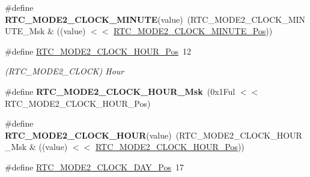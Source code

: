 \begin{DoxyCompactItemize}
\item 
\hypertarget{group___s_a_m_l21___r_t_c_ga852f4332930aecd5b658260e76f7bbf9}{}\#define {\bfseries R\+T\+C\+\_\+\+M\+O\+D\+E2\+\_\+\+C\+L\+O\+C\+K\+\_\+\+M\+I\+N\+U\+T\+E}(value)~(R\+T\+C\+\_\+\+M\+O\+D\+E2\+\_\+\+C\+L\+O\+C\+K\+\_\+\+M\+I\+N\+U\+T\+E\+\_\+\+Msk \& ((value) $<$$<$ \hyperlink{group___s_a_m_l21___r_t_c_ga6833c1b1a7d09a2acde357c93ffaa723}{R\+T\+C\+\_\+\+M\+O\+D\+E2\+\_\+\+C\+L\+O\+C\+K\+\_\+\+M\+I\+N\+U\+T\+E\+\_\+\+Pos}))\label{group___s_a_m_l21___r_t_c_ga852f4332930aecd5b658260e76f7bbf9}

\item 
\hypertarget{group___s_a_m_l21___r_t_c_ga9d3b894886a7457a79dea73e59447dfb}{}\#define \hyperlink{group___s_a_m_l21___r_t_c_ga9d3b894886a7457a79dea73e59447dfb}{R\+T\+C\+\_\+\+M\+O\+D\+E2\+\_\+\+C\+L\+O\+C\+K\+\_\+\+H\+O\+U\+R\+\_\+\+Pos}~12\label{group___s_a_m_l21___r_t_c_ga9d3b894886a7457a79dea73e59447dfb}

\begin{DoxyCompactList}\small\item\em (R\+T\+C\+\_\+\+M\+O\+D\+E2\+\_\+\+C\+L\+O\+C\+K) Hour \end{DoxyCompactList}\item 
\hypertarget{group___s_a_m_l21___r_t_c_ga805c8903fb32bb70279c4ba72478a2da}{}\#define {\bfseries R\+T\+C\+\_\+\+M\+O\+D\+E2\+\_\+\+C\+L\+O\+C\+K\+\_\+\+H\+O\+U\+R\+\_\+\+Msk}~(0x1\+Ful $<$$<$ R\+T\+C\+\_\+\+M\+O\+D\+E2\+\_\+\+C\+L\+O\+C\+K\+\_\+\+H\+O\+U\+R\+\_\+\+Pos)\label{group___s_a_m_l21___r_t_c_ga805c8903fb32bb70279c4ba72478a2da}

\item 
\hypertarget{group___s_a_m_l21___r_t_c_ga5778ea1a6ebd061005fb49ac68ab3d23}{}\#define {\bfseries R\+T\+C\+\_\+\+M\+O\+D\+E2\+\_\+\+C\+L\+O\+C\+K\+\_\+\+H\+O\+U\+R}(value)~(R\+T\+C\+\_\+\+M\+O\+D\+E2\+\_\+\+C\+L\+O\+C\+K\+\_\+\+H\+O\+U\+R\+\_\+\+Msk \& ((value) $<$$<$ \hyperlink{group___s_a_m_l21___r_t_c_ga9d3b894886a7457a79dea73e59447dfb}{R\+T\+C\+\_\+\+M\+O\+D\+E2\+\_\+\+C\+L\+O\+C\+K\+\_\+\+H\+O\+U\+R\+\_\+\+Pos}))\label{group___s_a_m_l21___r_t_c_ga5778ea1a6ebd061005fb49ac68ab3d23}

\item 
\hypertarget{group___s_a_m_l21___r_t_c_gafa4112a8769af0335892fa86149f5324}{}\#define \hyperlink{group___s_a_m_l21___r_t_c_gafa4112a8769af0335892fa86149f5324}{R\+T\+C\+\_\+\+M\+O\+D\+E2\+\_\+\+C\+L\+O\+C\+K\+\_\+\+D\+A\+Y\+\_\+\+Pos}~17\label{group___s_a_m_l21___r_t_c_gafa4112a8769af0335892fa86149f5324}


\end{DoxyCompactItemize}
